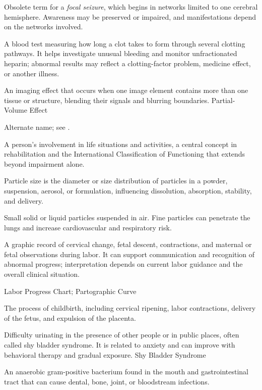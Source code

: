  Obsolete term for a \textit{focal seizure}, which begins in networks limited to one cerebral hemisphere. Awareness may be preserved or impaired, and manifestations depend on the networks involved.

 A blood test measuring how long a clot takes to form through several clotting pathways. It helps investigate unusual bleeding and monitor unfractionated heparin; abnormal results may reflect a clotting-factor problem, medicine effect, or another illness.

 An imaging effect that occurs when one image element contains more than one tissue or structure, blending their signals and blurring boundaries.
\synonyms
Partial-Volume Effect

 Alternate name; see .

 A person’s involvement in life situations and activities, a central concept in rehabilitation and the International Classification of Functioning that extends beyond impairment alone.

 Particle size is the diameter or size distribution of particles in a powder, suspension, aerosol, or formulation, influencing dissolution, absorption, stability, and delivery.

 Small solid or liquid particles suspended in air. Fine particles can penetrate the lungs and increase
cardiovascular and respiratory risk.

 A graphic record of cervical change, fetal descent, contractions, and maternal or fetal observations during
labor. It can support communication and recognition of abnormal progress; interpretation
depends on current labor guidance and the overall clinical situation.

\synonyms
Labor Progress Chart; Partographic Curve

 The process of childbirth, including cervical ripening, labor contractions, delivery of the fetus, and expulsion of the placenta.

 Difficulty urinating in the presence of other people or in public places, often called shy bladder syndrome. It is related to anxiety and can improve with behavioral therapy and gradual exposure.
\synonyms
Shy Bladder Syndrome

 An anaerobic gram-positive bacterium found in the mouth and gastrointestinal tract that can cause dental, bone, joint, or bloodstream infections.

